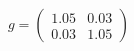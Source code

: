 \documentclass[preview]{standalone}
\begin{document}
\begin{align*}
g = \begin{pmatrix} 1.05 & 0.03 \\ 0.03 & 1.05 \end{pmatrix}
\end{align*}
\end{document}
